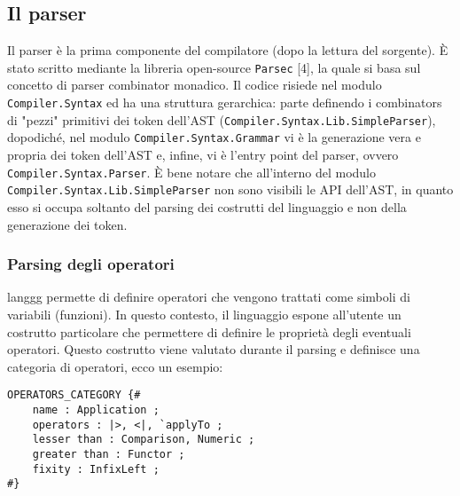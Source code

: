 \documentclass[10pt,a4paper]{article}
\begin{document}
\subsection{Il parser}
Il parser è la prima componente del compilatore (dopo la lettura del sorgente). \`E stato scritto mediante la libreria
open-source \texttt{Parsec} [4], la quale si basa sul concetto di parser combinator monadico. Il codice risiede nel
modulo \texttt{Compiler.Syntax} ed ha una struttura gerarchica: parte definendo i combinators di "pezzi" primitivi dei
token dell'AST (\texttt{Compiler.Syntax.Lib.SimpleParser}), dopodiché, nel modulo \texttt{Compiler.Syntax.Grammar} vi
è la generazione vera e propria dei token dell'AST e, infine, vi è l'entry point del parser, ovvero
\texttt{Compiler.Syntax.Parser}. \`E bene notare che all'interno del modulo \texttt{Compiler.Syntax.Lib.SimpleParser}
non sono visibili le API dell'AST, in quanto esso si occupa soltanto del parsing dei costrutti del linguaggio e non
della generazione dei token.

\subsubsection{Parsing degli operatori}
langgg permette di definire operatori che vengono trattati come simboli di variabili (funzioni). In questo contesto,
il linguaggio espone all'utente un costrutto particolare che permettere di definire le proprietà degli eventuali
operatori. Questo costrutto viene valutato durante il parsing e definisce una categoria di operatori, ecco un esempio:

\begin{lstlisting}
OPERATORS_CATEGORY {#
    name : Application ;
    operators : |>, <|, `applyTo ;
    lesser than : Comparison, Numeric ;
    greater than : Functor ;
    fixity : InfixLeft ;
#}
\end{lstlisting}
\end{document}
